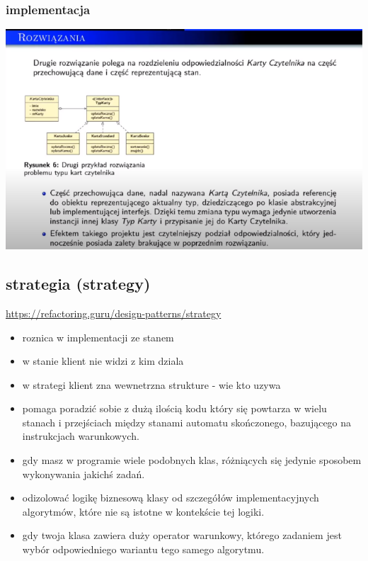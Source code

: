 \documentclass[11pt]{article}
\begin{document}
\subsubsection{implementacja}
\label{sec:org2bda666}
\begin{center}
\includegraphics[width=.9\linewidth]{./stan.png}
\end{center}
\subsection{strategia (strategy)}
\label{sec:org76855fc}
\url{https://refactoring.guru/design-patterns/strategy}
\begin{itemize}
\item roznica w implementacji ze stanem
\item w stanie klient nie widzi z kim dziala
\item w strategi klient zna wewnetrzna strukture - wie kto uzywa
\item pomaga poradzić sobie z dużą ilością kodu który się powtarza w wielu stanach i przejściach między stanami automatu skończonego, bazującego na instrukcjach warunkowych.
\item gdy masz w programie wiele podobnych klas, różniących się jedynie sposobem wykonywania jakichś zadań.
\item odizolować logikę biznesową klasy od szczegółów implementacyjnych algorytmów, które nie są istotne w kontekście tej logiki.
\item gdy twoja klasa zawiera duży operator warunkowy, którego zadaniem jest wybór odpowiedniego wariantu tego samego algorytmu.
\end{itemize}
\end{document}
